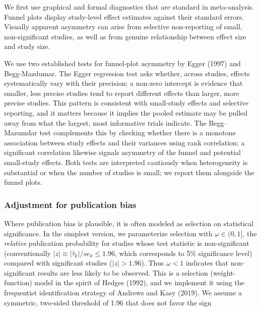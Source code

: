 \documentclass[12pt]{article}
\begin{document}
We first use graphical and formal diagnostics that are standard in meta‐analysis. Funnel plots display study‐level effect estimates against their standard errors. Visually apparent asymmetry can arise from selective non-reporting of small, non-significant studies, as well as from genuine relationship between effect size and study size.

We use two established tests for funnel‐plot asymmetry by Egger (1997) and Begg-Mazdumar. The Egger regression test asks whether, across studies, effects systematically vary with their precision; a non-zero intercept is evidence that smaller, less precise studies tend to report different effects than larger, more precise studies. This pattern is consistent with small-study effects and selective reporting, and it matters because it implies the pooled estimate may be pulled away from what the largest, most informative trials indicate. The Begg–Mazumdar test complements this by checking whether there is a monotone association between study effects and their variances using rank correlation; a significant correlation likewise signals asymmetry of the funnel and potential small-study effects. Both tests are interpreted cautiously when heterogeneity is substantial or when the number of studies is small; we report them alongside the funnel plots.

\subsubsection{Adjustment for publication bias}

Where publication bias is plausible, it is often modeled as selection on statistical significance. In the simplest version, we parameterize selection with \(\omega \in (0,1]\), the \emph{relative} publication probability for studies whose test statistic is non-significant (conventionally \(|z| \equiv |\hat{\tau}_k| / se_k \le 1.96\), which corresponds to 5\% significance level) compared with significant studies (\(|z|>1.96\)). Thus \(\omega<1\) indicates that non-significant results are less likely to be observed. This is a selection (weight-function) model in the spirit of Hedges (1992), and we implement it using the frequentist identification strategy of Andrews and Kasy (2019). We assume a symmetric, two-sided threshold of 1.96 that does not favor the sign
\end{document}
